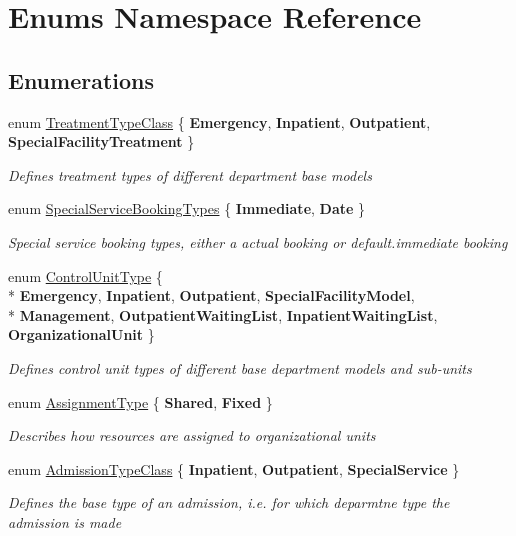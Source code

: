\hypertarget{namespace_enums}{}\section{Enums Namespace Reference}
\label{namespace_enums}
\subsection*{Enumerations}
\begin{DoxyCompactItemize}
\item 
enum \hyperlink{namespace_enums_a818a2209a7496285390744fe2e319e3d}{Treatment\+Type\+Class} \{ {\bfseries Emergency}, 
{\bfseries Inpatient}, 
{\bfseries Outpatient}, 
{\bfseries Special\+Facility\+Treatment}
 \}\begin{DoxyCompactList}\small\item\em Defines treatment types of different department base models \end{DoxyCompactList}
\item 
enum \hyperlink{namespace_enums_a983d5bd1d6201551a5cc9c34c53d1af6}{Special\+Service\+Booking\+Types} \{ {\bfseries Immediate}, 
{\bfseries Date}
 \}\begin{DoxyCompactList}\small\item\em Special service booking types, either a actual booking or default.\+immediate booking \end{DoxyCompactList}
\item 
enum \hyperlink{namespace_enums_aeea01f7c2eb29cb3e9e88daa9732d231}{Control\+Unit\+Type} \{ \\*
{\bfseries Emergency}, 
{\bfseries Inpatient}, 
{\bfseries Outpatient}, 
{\bfseries Special\+Facility\+Model}, 
\\*
{\bfseries Management}, 
{\bfseries Outpatient\+Waiting\+List}, 
{\bfseries Inpatient\+Waiting\+List}, 
{\bfseries Organizational\+Unit}
 \}\begin{DoxyCompactList}\small\item\em Defines control unit types of different base department models and sub-\/units \end{DoxyCompactList}
\item 
enum \hyperlink{namespace_enums_ac8e46c12834f4cb6a641854bd0676221}{Assignment\+Type} \{ {\bfseries Shared}, 
{\bfseries Fixed}
 \}\begin{DoxyCompactList}\small\item\em Describes how resources are assigned to organizational units \end{DoxyCompactList}
\item 
enum \hyperlink{namespace_enums_a2d94ac8cd083deb7c44bcb8c8e3c5eea}{Admission\+Type\+Class} \{ {\bfseries Inpatient}, 
{\bfseries Outpatient}, 
{\bfseries Special\+Service}
 \}\begin{DoxyCompactList}\small\item\em Defines the base type of an admission, i.\+e. for which deparmtne type the admission is made \end{DoxyCompactList}
\end{DoxyCompactItemize}


